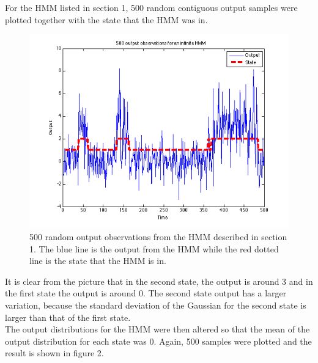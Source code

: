 \documentclass[11pt]{article}   %
\begin{document}
For the HMM listed in section 1, 500 random contiguous output samples were plotted together with the state that the HMM was in.

\begin{figure}[H]
\begin{center}
\leavevmode
\includegraphics[width=1\textwidth]{infiniteHMMoutput.png}
\end{center}
\caption{500 random output observations from the HMM described in section 1. The blue line is the output from the HMM while the red dotted line is the state that the HMM is in.}
\label{euler:1}
\end{figure}

It is clear from the picture that in the second state, the output is around 3 and in the first state the output is around 0. The second state output has a larger variation, because the standard deviation of the Gaussian for the second state is larger than that of the first state. \\
\newpage
The output distributions for the HMM were then altered so that the mean of the output distribution for each state was 0. Again, 500 samples were plotted and the result is shown in figure 2. 
\end{document}
